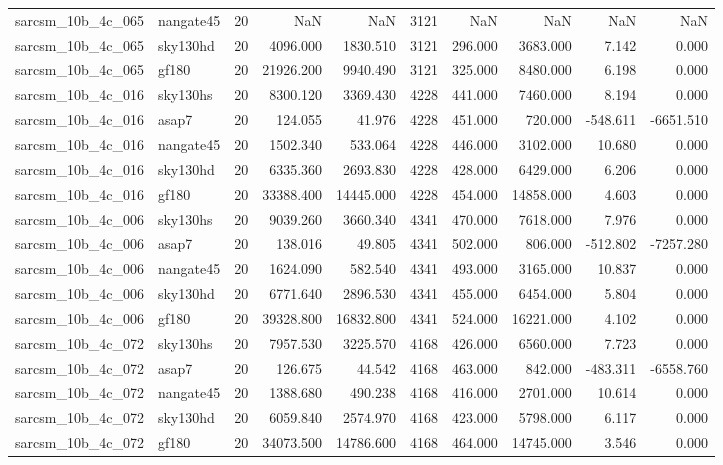 \documentclass{article}
\begin{document}
\begin{longtable}{llrrrrrrrr}
sarcsm\_10b\_4c\_065 & nangate45 & 20 & NaN & NaN & 3121 & NaN & NaN & NaN & NaN \\
sarcsm\_10b\_4c\_065 & sky130hd & 20 & 4096.000 & 1830.510 & 3121 & 296.000 & 3683.000 & 7.142 & 0.000 \\
sarcsm\_10b\_4c\_065 & gf180 & 20 & 21926.200 & 9940.490 & 3121 & 325.000 & 8480.000 & 6.198 & 0.000 \\
sarcsm\_10b\_4c\_016 & sky130hs & 20 & 8300.120 & 3369.430 & 4228 & 441.000 & 7460.000 & 8.194 & 0.000 \\
sarcsm\_10b\_4c\_016 & asap7 & 20 & 124.055 & 41.976 & 4228 & 451.000 & 720.000 & -548.611 & -6651.510 \\
sarcsm\_10b\_4c\_016 & nangate45 & 20 & 1502.340 & 533.064 & 4228 & 446.000 & 3102.000 & 10.680 & 0.000 \\
sarcsm\_10b\_4c\_016 & sky130hd & 20 & 6335.360 & 2693.830 & 4228 & 428.000 & 6429.000 & 6.206 & 0.000 \\
sarcsm\_10b\_4c\_016 & gf180 & 20 & 33388.400 & 14445.000 & 4228 & 454.000 & 14858.000 & 4.603 & 0.000 \\
sarcsm\_10b\_4c\_006 & sky130hs & 20 & 9039.260 & 3660.340 & 4341 & 470.000 & 7618.000 & 7.976 & 0.000 \\
sarcsm\_10b\_4c\_006 & asap7 & 20 & 138.016 & 49.805 & 4341 & 502.000 & 806.000 & -512.802 & -7257.280 \\
sarcsm\_10b\_4c\_006 & nangate45 & 20 & 1624.090 & 582.540 & 4341 & 493.000 & 3165.000 & 10.837 & 0.000 \\
sarcsm\_10b\_4c\_006 & sky130hd & 20 & 6771.640 & 2896.530 & 4341 & 455.000 & 6454.000 & 5.804 & 0.000 \\
sarcsm\_10b\_4c\_006 & gf180 & 20 & 39328.800 & 16832.800 & 4341 & 524.000 & 16221.000 & 4.102 & 0.000 \\
sarcsm\_10b\_4c\_072 & sky130hs & 20 & 7957.530 & 3225.570 & 4168 & 426.000 & 6560.000 & 7.723 & 0.000 \\
sarcsm\_10b\_4c\_072 & asap7 & 20 & 126.675 & 44.542 & 4168 & 463.000 & 842.000 & -483.311 & -6558.760 \\
sarcsm\_10b\_4c\_072 & nangate45 & 20 & 1388.680 & 490.238 & 4168 & 416.000 & 2701.000 & 10.614 & 0.000 \\
sarcsm\_10b\_4c\_072 & sky130hd & 20 & 6059.840 & 2574.970 & 4168 & 423.000 & 5798.000 & 6.117 & 0.000 \\
sarcsm\_10b\_4c\_072 & gf180 & 20 & 34073.500 & 14786.600 & 4168 & 464.000 & 14745.000 & 3.546 & 0.000 \\

\end{longtable}
\end{document}
